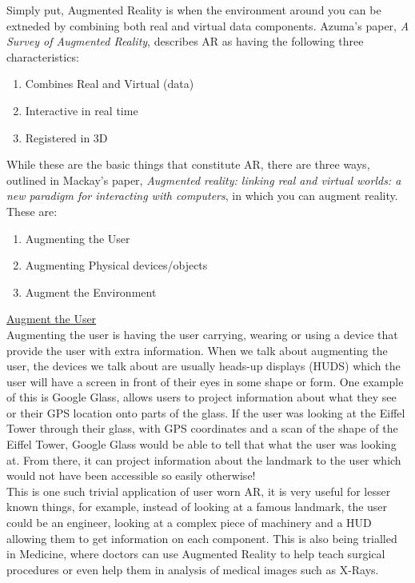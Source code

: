 \documentclass[11pt]{report}
\begin{document}
Simply put, Augmented Reality is when the environment around you can be 
extneded by combining both real and virtual data components. Azuma's 
paper\cite{Azuma97}, \textit{A Survey of Augmented Reality},
describes AR as having the following three characteristics:
\begin{enumerate}
	\item Combines Real and Virtual (data) 
	\item Interactive in real time
	\item Registered in 3D
\end{enumerate}

While these are the basic things that constitute AR, there are three ways, 
outlined in Mackay's paper\cite{Mackay}, \textit{Augmented reality: linking 
real and virtual worlds: a new paradigm for interacting with computers},
in which you can augment reality.\\
These are:
\begin{enumerate}
	\item Augmenting the User
	\item Augmenting Physical devices/objects
	\item Augment the Environment
\end{enumerate}

\underline{Augment the User} \\
Augmenting the user is having the user carrying, wearing or using a device
that provide the user with extra information. When we talk about augmenting
the user, the devices we talk about are usually
heads-up displays (HUDS) which the user will have a screen in front of their
eyes in some shape or form. One example of this is Google Glass, allows
users to project information about what they see or their GPS location onto
parts of the glass. If the user was looking at the Eiffel Tower through their 
glass, with GPS coordinates and a scan of the shape of the Eiffel Tower, 
Google Glass would be able to tell that what the user was looking at. From there,
it can project information about the landmark to the user which would not have
been accessible so easily otherwise! \\

This is one such trivial application of
user worn AR, it is very useful for lesser known things, for example, instead of 
looking at a famous landmark, the user could be an engineer, looking at a 
complex piece of machinery and a HUD allowing them to get information on each
component. This is also being trialled in Medicine, where doctors can use
Augmented Reality to help teach surgical procedures or even help them in
analysis of medical images such as X-Rays.\\
\end{document}
